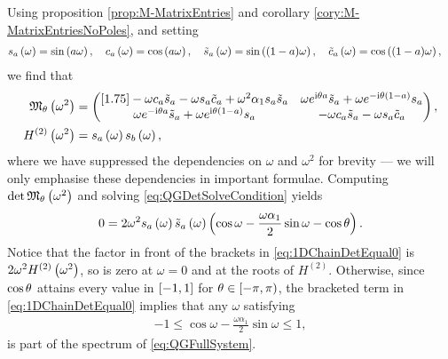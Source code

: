 Using proposition \ref{prop:M-MatrixEntries} and corollary \ref{cory:M-MatrixEntriesNoPoles}, and setting
\begin{align*}
	s_a\left( \omega \right) &= \sin\left( a\omega \right), \quad c_a\left( \omega \right) = \cos\left( a\omega \right), 
	\quad \tilde{s}_a\left( \omega \right) = \sin\left( (1-a)\omega \right), \quad \tilde{c}_a\left( \omega \right) = \cos\left( (1-a)\omega \right),
\end{align*} 
we find that
\begin{align*}
	\mathfrak{M}_{\theta}\left( \omega^2 \right) &= 
	\begin{pmatrix}[1.75]
		-\omega c_a \tilde{s}_a - \omega s_a \tilde{c}_{a} + \omega^2\alpha_1 s_a \tilde{s}_a &
		\omega e^{\mathrm{i}\theta a} \tilde{s}_a + \omega e^{-\mathrm{i}\theta(1-a)} s_a \\
		\omega e^{-\mathrm{i}\theta a} \tilde{s}_a + \omega e^{\mathrm{i}\theta(1-a)} s_a &
		-\omega c_a \tilde{s}_a - \omega s_a \tilde{c}_a
	\end{pmatrix}, \\
	H^{(2)}\left( \omega^2 \right) &= s_a\left( \omega \right) s_b\left( \omega \right),\\
\end{align*}
where we have suppressed the dependencies on $\omega$ and $\omega^2$ for brevity --- we will only emphasise these dependencies in important formulae.
Computing $\det\mathfrak{M}_{\theta}\left( \omega^2 \right)$ and solving \eqref{eq:QGDetSolveCondition} yields
\begin{align} \label{eq:1DChainDetEqual0}
	0 = 2\omega^2 s_a\left( \omega \right) \tilde{s}_a\left( \omega \right) \left(  \cos\omega - \frac{\omega\alpha_1}{2}\sin\omega - \cos\theta  \right).
\end{align}
Notice that the factor in front of the brackets in \eqref{eq:1DChainDetEqual0} is $2\omega^2 H^{(2)}\left( \omega^2 \right)$, so is zero at $\omega=0$ and at the roots of $H^{(2)}$.
Otherwise, since $\cos\theta$ attains every value in $\left[ -1,1 \right]$ for $\theta\in\left[-\pi,\pi\right)$, the bracketed term in \eqref{eq:1DChainDetEqual0} implies that any $\omega$ satisfying
\begin{align*}
	-1 \leq \cos\omega - \frac{\omega\alpha_1}{2}\sin\omega \leq 1,
\end{align*}
is part of the spectrum of \eqref{eq:QGFullSystem}.

